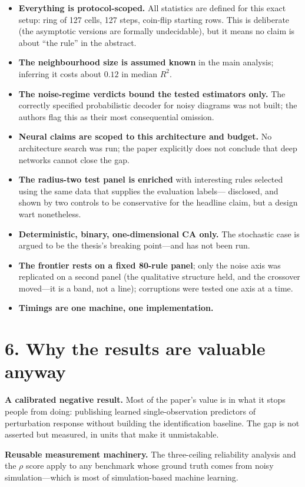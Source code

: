 \documentclass[11pt,a4paper]{article}
\begin{document}
\begin{itemize}
\item \textbf{Everything is protocol-scoped.} All statistics are defined for
this exact setup: ring of 127 cells, 127 steps, coin-flip starting rows.
This is deliberate (the asymptotic versions are formally undecidable), but
it means no claim is about ``the rule'' in the abstract.
\item \textbf{The neighbourhood size is assumed known} in the main analysis;
inferring it costs about $0.12$ in median $R^2$.
\item \textbf{The noise-regime verdicts bound the tested estimators only.}
The correctly specified probabilistic decoder for noisy diagrams was not
built; the authors flag this as their most consequential omission.
\item \textbf{Neural claims are scoped to this architecture and budget.} No
architecture search was run; the paper explicitly does not conclude that
deep networks cannot close the gap.
\item \textbf{The radius-two test panel is enriched} with interesting rules
selected using the same data that supplies the evaluation labels---
disclosed, and shown by two controls to be conservative for the headline
claim, but a design wart nonetheless.
\item \textbf{Deterministic, binary, one-dimensional CA only.} The
stochastic case is argued to be the thesis's breaking point---and has not
been run.
\item \textbf{The frontier rests on a fixed 80-rule panel}; only the noise
axis was replicated on a second panel (the qualitative structure held, and
the crossover moved---it is a band, not a line); corruptions were tested one
axis at a time.
\item \textbf{Timings are one machine, one implementation.}
\end{itemize}

\section*{6. Why the results are valuable anyway}

\textbf{A calibrated negative result.} Most of the paper's value is in what
it stops people from doing: publishing learned single-observation predictors
of perturbation response without building the identification baseline. The
gap is not asserted but measured, in units that make it unmistakable.

\textbf{Reusable measurement machinery.} The three-ceiling reliability
analysis and the $\rho$ score apply to any benchmark whose ground truth
comes from noisy simulation---which is most of simulation-based machine
learning.
\end{document}
